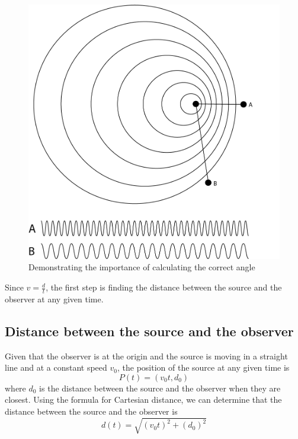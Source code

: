 \documentclass[12pt]{article}
\begin{document}
\begin{figure}[H]
	\centering
	\includegraphics[width=5in]{angle}
	\caption{Demonstrating the importance of calculating the correct angle}
	\label{fig:angle}
\end{figure}

Since $ v = \frac{d}{t} $, the first step is finding the distance between the source and the observer at any given time.

\subsection{Distance between the source and the observer}

Given that the observer is at the origin and the source is moving in a straight line and at a constant speed $v_0$, the position of the source at any given time is $$ P(t) = (v_0 t, d_0)$$ where $d_0$ is the distance between the source and the observer when they are closest. Using the formula for Cartesian distance, we can determine that the distance between the source and the observer is $$ d(t) = \sqrt{(v_0 t) ^ 2 + (d_0) ^ 2} $$
\end{document}
